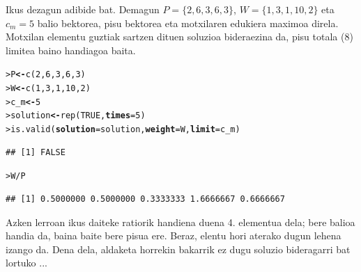 \documentclass[eu]{ifirak}\usepackage[]{graphicx}\usepackage[]{color}
\makeatletter
\newcommand{\hlnum}[1]{\textcolor[rgb]{0.659,0.4,0.051}{#1}}%
\newcommand{\hlopt}[1]{\textcolor[rgb]{0,0,0}{#1}}%
\newcommand{\hlstd}[1]{\textcolor[rgb]{0,0,0}{#1}}%
\newcommand{\hlkwb}[1]{\textcolor[rgb]{0.549,0.114,0.412}{\textbf{#1}}}%
\newcommand{\hlkwc}[1]{\textcolor[rgb]{0.659,0.573,0.133}{\textbf{#1}}}%
\newcommand{\hlkwd}[1]{\textcolor[rgb]{0.659,0.133,0.482}{#1}}%
\newenvironment{kframe}{%
 \def\at@end@of@kframe{}%
 \ifinner\ifhmode%
  \def\at@end@of@kframe{\end{minipage}}%
  \begin{minipage}{\columnwidth}%
 \fi\fi%
 \def\FrameCommand##1{\hskip\@totalleftmargin \hskip-\fboxsep
 \colorbox{shadecolor}{##1}\hskip-\fboxsep
     \hskip-\linewidth \hskip-\@totalleftmargin \hskip\columnwidth}%
 \MakeFramed {\advance\hsize-\width
   \@totalleftmargin\z@ \linewidth\hsize
   \@setminipage}}%
 {\par\unskip\endMakeFramed%
 \at@end@of@kframe}
\newenvironment{knitrout}{}{} %
\makeatother
\begin{document}
Ikus dezagun adibide bat. Demagun $P=\{2,6,3,6,3\}$, $W=\{1,3,1,10,2\}$ eta $c_m = 5$ balio bektorea, pisu bektorea eta motxilaren edukiera maximoa direla. Motxilan elementu guztiak sartzen dituen soluzioa bideraezina da, pisu totala (8) limitea baino handiagoa baita.

\begin{knitrout}
\color{fgcolor}\begin{kframe}
\begin{alltt}
\hlstd{> }\hlstd{P} \hlkwb{<-} \hlkwd{c}\hlstd{(}\hlnum{2} \hlstd{,} \hlnum{6} \hlstd{,} \hlnum{3} \hlstd{,} \hlnum{6} \hlstd{,} \hlnum{3}\hlstd{)}
\hlstd{> }\hlstd{W} \hlkwb{<-} \hlkwd{c}\hlstd{(}\hlnum{1} \hlstd{,} \hlnum{3} \hlstd{,} \hlnum{1} \hlstd{,} \hlnum{10} \hlstd{,} \hlnum{2}\hlstd{)}
\hlstd{> }\hlstd{c_m} \hlkwb{<-} \hlnum{5}
\hlstd{> }\hlstd{solution} \hlkwb{<-} \hlkwd{rep}\hlstd{(}\hlnum{TRUE}\hlstd{,} \hlkwc{times} \hlstd{=} \hlnum{5}\hlstd{)}
\hlstd{> }\hlkwd{is.valid}\hlstd{(}\hlkwc{solution} \hlstd{= solution ,} \hlkwc{weight} \hlstd{= W ,} \hlkwc{limit} \hlstd{= c_m)}
\end{alltt}
\begin{verbatim}
## [1] FALSE
\end{verbatim}
\begin{alltt}
\hlstd{> }\hlstd{W}\hlopt{/}\hlstd{P}
\end{alltt}
\begin{verbatim}
## [1] 0.5000000 0.5000000 0.3333333 1.6666667 0.6666667
\end{verbatim}
\end{kframe}
\end{knitrout}

Azken lerroan ikus daiteke ratiorik handiena duena 4. elementua dela; bere balioa handia da, baina baite bere pisua ere. Beraz, elentu hori aterako dugun lehena izango da. Dena dela, aldaketa horrekin bakarrik ez dugu soluzio bideragarri bat lortuko ...
\end{document}

